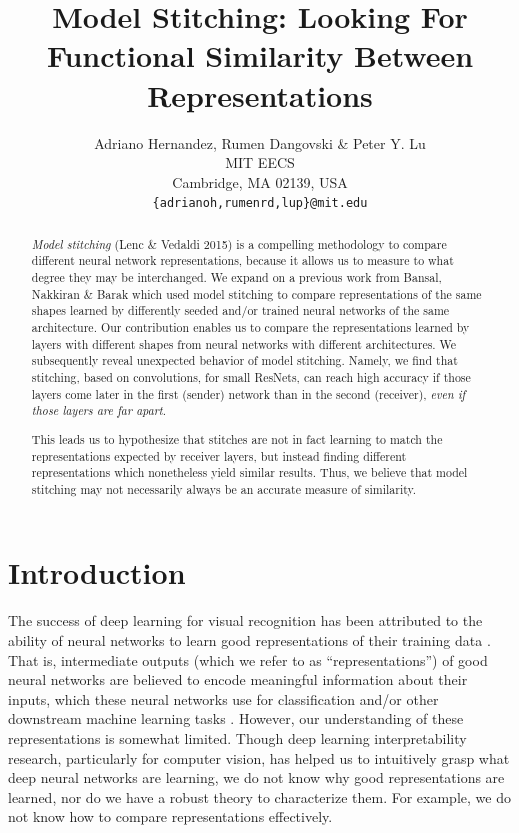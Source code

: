 \documentclass{article}
\title{Model Stitching: Looking For Functional Similarity Between Representations}
\author{Adriano Hernandez, Rumen Dangovski \& Peter Y. Lu\\
MIT EECS\\
Cambridge, MA 02139, USA \\
\texttt{\{adrianoh,rumenrd,lup\}@mit.edu}
}
\begin{document}
\maketitle

\begin{abstract}
  \textit{Model stitching} (Lenc \& Vedaldi 2015) is a compelling methodology to compare
  different neural network representations, because it allows us to measure to
  what degree they may be interchanged.
  We expand on a previous work from Bansal, Nakkiran \& Barak which used model stitching to
  compare representations of the same shapes learned by differently seeded
  and/or trained neural networks of the same architecture.
  Our contribution enables us to compare the representations learned by layers with
  different shapes from neural networks with different architectures.
  We subsequently reveal unexpected behavior of model stitching. Namely, we find that stitching, 
  based on convolutions, for small ResNets, can reach
  high accuracy if those layers come later in the first (sender) network than in
  the second (receiver), \textit{even if those layers are far apart}. 

  This leads us to hypothesize that stitches are not in fact learning to match the
  representations expected by receiver layers, but instead finding different representations which nonetheless
  yield similar results. Thus, we believe that model stitching may not necessarily always be an
  accurate measure of similarity.
\end{abstract}

\section{Introduction}
The success of deep learning for visual recognition has been attributed to the ability of neural networks to learn
good representations of their training data \cite{Rumelhart1986LearningIR}. That is, intermediate outputs (which we refer
to as ``representations'') of good neural networks 
are believed to encode meaningful information about their inputs, which these neural networks use for classification and/or other
downstream machine learning tasks \cite{goodfellow2016deep}.
However, our understanding of these representations is somewhat limited. Though
deep learning interpretability research, particularly for computer vision, has helped us
to intuitively grasp what deep neural 
networks are learning, we do not
know why good representations are learned, nor do we have a robust theory to characterize them. For example, we do not
know how to compare representations effectively.
\end{document}
